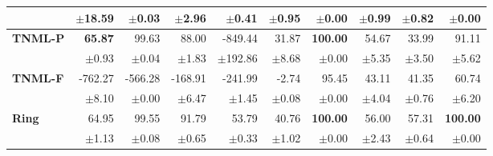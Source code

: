 \begin{table}[!htbp]
\begin{tabular}{lrrrrr||rrrr}
 & $\pm$18.59 & $\pm$0.03 & $\pm$2.96 & $\pm$0.41 & $\pm$0.95 & $\pm$0.00 & $\pm$0.99 & $\pm$0.82 & $\pm$0.00 \\
\midrule
\textbf{TNML-P} & \textbf{65.87} & 99.63 & 88.00 & -849.44 & 31.87 & \textbf{100.00} & 54.67 & 33.99 & 91.11 \\
 & $\pm$0.93 & $\pm$0.04 & $\pm$1.83 & $\pm$192.86 & $\pm$8.68 & $\pm$0.00 & $\pm$5.35 & $\pm$3.50 & $\pm$5.62 \\
\midrule
\textbf{TNML-F} & -762.27 & -566.28 & -168.91 & -241.99 & -2.74 & 95.45 & 43.11 & 41.35 & 60.74 \\
 & $\pm$8.10 & $\pm$0.00 & $\pm$6.47 & $\pm$1.45 & $\pm$0.08 & $\pm$0.00 & $\pm$4.04 & $\pm$0.76 & $\pm$6.20 \\
\midrule
\textbf{Ring} & 64.95 & 99.55 & 91.79 & 53.79 & 40.76 & \textbf{100.00} & 56.00 & 57.31 & \textbf{100.00} \\
 & $\pm$1.13 & $\pm$0.08 & $\pm$0.65 & $\pm$0.33 & $\pm$1.02 & $\pm$0.00 & $\pm$2.43 & $\pm$0.64 & $\pm$0.00 \\
\midrule
\bottomrule
\end{tabular}
\end{table}